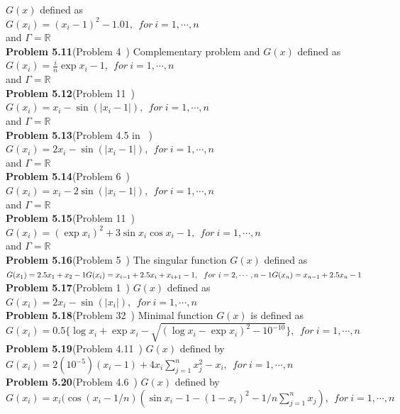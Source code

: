\documentclass{article}
\newcommand{\R}{\mathbb{R}} %
\theoremstyle{remark}
\begin{document}
{{ $G(x)$ defined as\\$
 G(x_i) = (x_i-1)^2 - 1.01, ~~for ~i=1, \cdots, n$\\and 
 $\Gamma =\R$\\
 {\bf Problem 5.11}(Problem 4~\cite{song2024efficient}) Complementary problem and 
 $G(x)$ defined as\\$
 G(x_i) =\frac{i}{n} \exp{x_i}-1 , ~~for ~i=1, \cdots, n$\\and 
 $\Gamma =\R$\\
{\bf Problem 5.12}(Problem 11~\cite{ibrahim2024two})\\
 $ G(x_i) =x_i- \sin(|x_i - 1|) , ~~for ~i=1, \cdots, n$\\and 
 $\Gamma =\R$\\
{\bf Problem 5.13}(Problem 4.5 in ~\cite{waziri2022two})\\$
 G(x_i) =2x_i- \sin(|x_i - 1|) , ~~for ~i=1, \cdots, n$\\and 
 $\Gamma =\R$\\
{\bf Problem 5.14}(Problem 6~\cite{song2024efficient}) 
 \\$
 G(x_i) =x_i- 2\sin(|x_i - 1|) , ~~for ~i=1, \cdots, n$\\and 
 $\Gamma =\R$\\
{\bf Problem 5.15}(Problem 11~\cite{song2024efficient}) 
 \\$
 G(x_i) =(\exp{x_i})^2+3\sin x_i\cos x_i-1 , ~~for ~i=1, \cdots, n$\\and 
 $\Gamma =\R$\\
 {\bf Problem 5.16}(Problem 5~\cite{waziri2020descent}) The  singular function
 $G(x)$ defined as\\
 $G(x_1)=2.5x_1 +x_2 - 1\\
 G(x_i) = x_{i-1} + 2.5x_i + x_{i+1} - 1, ~~for ~i=2, \cdots, n-1\\
 G(x_n)=x_{n-1} + 2.5x_n - 1$\\
 {\bf Problem 5.17}(Problem 1~\cite{zhou2007limited}) $G(x)$ defined as\\$
 G(x_i) =  2x_i - \sin(|x_i|), ~~for ~i=1, \cdots, n$\\
 {\bf Problem 5.18}(Problem 32~\cite{la2006spectral}) Minimal function  $G(x)$ is defined as\\$
 G(x_i) = 0.5\{\log{x_i}+\exp{x_i} -\sqrt{(\log{x_i}-\exp{x_i})^2-10^{-10} }\}, ~~for ~i=1, \cdots, n$\\
 {\bf Problem 5.19}(Problem 4.11~\cite{li2021scaled}) $G(x)$ defined by\\$
 G(x_i) = 2(10^{-5})(x_i-1) + 4x_i \sum_{j=1}^nx_j^2 - x_i, ~~for ~i=1, \cdots, n$\\
{\bf Problem 5.20}(Problem 4.6~\cite{sabi2023modified})  $G(x)$ defined by\\$
 G(x_i) = x_{i}(\cos(x_i-1/n)(\sin x_i-1-(1-x_i)^2-1/n\sum_{j=1}^nx_j), ~~for ~i=1, \cdots, n$
 
}}
\end{document}
